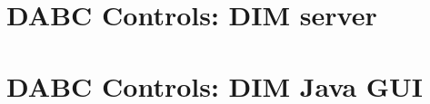 
\chapter{DABC Controls: DIM server}
 \cleardoublepage
\chapter{DABC Controls: DIM Java GUI}
 \cleardoublepage

